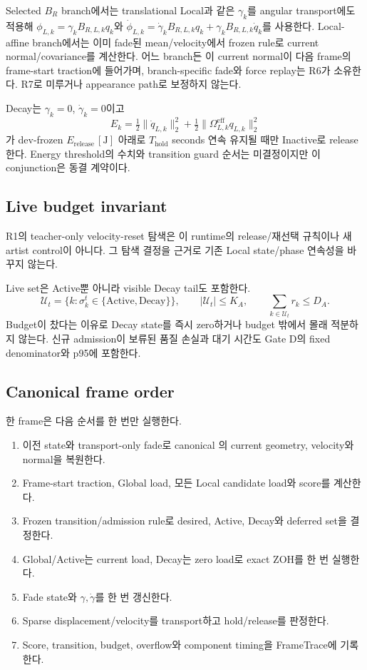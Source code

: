 \documentclass[10pt]{article}
\begin{document}
Selected \(B_R\) branch에서는 translational Local과 같은 \(\gamma_k\)를 angular transport에도 적용해
\(\phi_{L,k}=\gamma_kB_{R,L,k}q_k\)와
\(\dot\phi_{L,k}=\dot\gamma_kB_{R,L,k}q_k+\gamma_kB_{R,L,k}\dot q_k\)를 사용한다.
Local-affine branch에서는 이미 fade된 mean/velocity에서 frozen rule로 current normal/covariance를 계산한다.
어느 branch든 이 current normal이 다음 frame의 frame-start traction에 들어가며, branch-specific fade와
force replay는 R6가 소유한다. R7로 미루거나 appearance path로 보정하지 않는다.

Decay는 \(\gamma_k=0\), \(\dot\gamma_k=0\)이고
\[
  E_k=\tfrac12\|\dot q_{L,k}\|_2^2+
  \tfrac12\|\Omega_{L,k}^{\mathrm{eff}}q_{L,k}\|_2^2
\]
가 dev-frozen \(E_{\mathrm{release}}\,[\mathrm J]\) 아래로
\(T_{\mathrm{hold}}\) seconds 연속 유지될 때만 Inactive로 release한다.
Energy threshold의 수치와 transition guard 순서는 미결정이지만 이 conjunction은 동결 계약이다.

\subsection{Live budget invariant}

R1의 teacher-only velocity-reset 탐색은 이 runtime의 release/재선택 규칙이나 새 artist control이 아니다.
그 탐색 결정을 근거로 기존 Local state/phase 연속성을 바꾸지 않는다.

Live set은 Active뿐 아니라 visible Decay tail도 포함한다.
\[
  \mathcal U_t=\{k:\sigma_k^t\in\{\mathrm{Active},\mathrm{Decay}\}\},\qquad
  |\mathcal U_t|\le K_A,\qquad
  \sum_{k\in\mathcal U_t}r_k\le D_A.
\]
Budget이 찼다는 이유로 Decay state를 즉시 zero하거나 budget 밖에서 몰래 적분하지 않는다.
신규 admission이 보류된 품질 손실과 대기 시간도 Gate D의 fixed denominator와 p95에 포함한다.

\subsection{Canonical frame order}

한 frame은 다음 순서를 한 번만 실행한다.

\begin{enumerate}
  \item 이전 state와 transport-only fade로 canonical 의
  current geometry, velocity와 normal을 복원한다.
  \item Frame-start traction, Global load, 모든 Local candidate load와 score를 계산한다.
  \item Frozen transition/admission rule로 desired, Active, Decay와 deferred set을 결정한다.
  \item Global/Active는 current load, Decay는 zero load로 exact ZOH를 한 번 실행한다.
  \item Fade state와 \(\gamma,\dot\gamma\)를 한 번 갱신한다.
  \item Sparse displacement/velocity를 transport하고 hold/release를 판정한다.
  \item Score, transition, budget, overflow와 component timing을 FrameTrace에 기록한다.
\end{enumerate}
\end{document}

